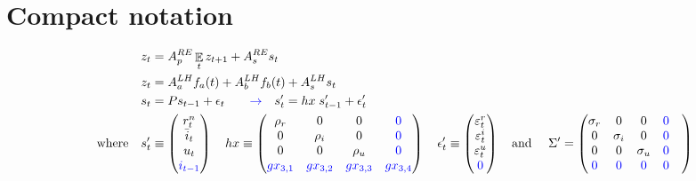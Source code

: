 \documentclass[11pt]{article}
\renewcommand{\[}{\begin{equation}}
\renewcommand{\]}{\end{equation}}
\DeclareMathOperator{\E}{\mathbb{E}}
\begin{document}
\section{Compact notation}
 \begin{align}
z_t & = A_p^{RE} \E_t z_{t+1} + A_s^{RE} s_t \label{LOM_RE} \\
z_t & = A_a^{LH} f_a(t) + A_b^{LH} f_b(t) + A_s^{LH} s_t \label{LOM_LH} \\
s_t & = P s_{t-1} + \epsilon_t \quad \quad \textcolor{blue}{\rightarrow} \quad s'_t  = hx \; s'_{t-1} + \epsilon'_t \label{exog} \\
 \quad \text{where} \quad 
 s'_t & \equiv \begin{pmatrix} r_t^n \\ \bar{i}_t \\ u_t \\ \textcolor{blue}{i_{t-1}}
 \end{pmatrix} \quad 
 hx  \equiv \begin{pmatrix} \rho_r & 0 & 0 & \textcolor{blue}{0} \\ 0& \rho_i & 0 & \textcolor{blue}{0} \\ 0&0& \rho_u & \textcolor{blue}{0}  \\ 
 \textcolor{blue}{gx_{3,1}}&\textcolor{blue}{gx_{3,2}}& \textcolor{blue}{gx_{3,3}} & \textcolor{blue}{gx_{3,4}}
 \end{pmatrix}  \quad 
 \epsilon'_t \equiv \begin{pmatrix}\varepsilon_t^{r} \\ \varepsilon_t^{i}  \\ \varepsilon_t^{u} \\ \textcolor{blue}{0} 
 \end{pmatrix}  \quad  \text{and } \quad \Sigma'  =  \begin{pmatrix} \sigma_r & 0 & 0 & \textcolor{blue}{0} \\ 0& \sigma_i & 0 & \textcolor{blue}{0}  \\ 0&0& \sigma_u & \textcolor{blue}{0}  \\ \textcolor{blue}{0}  & \textcolor{blue}{0} & \textcolor{blue}{0} & \textcolor{blue}{0} &
 \end{pmatrix} 
\end{align}
\end{document}
